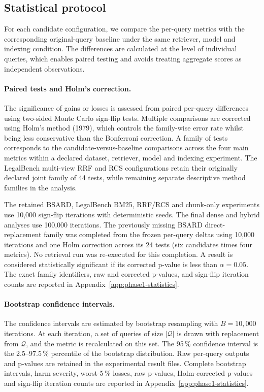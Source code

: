 \documentclass[a4paper,fleqn]{cas-dc}
\begin{document}
\subsection{Statistical protocol}

For each candidate configuration, we compare
the per-query metrics with the corresponding original-query
baseline under the same retriever, model and indexing condition.
The differences are calculated at the level of individual
queries, which enables paired testing and avoids treating
aggregate scores as independent observations.

\paragraph{Paired tests and Holm’s correction.}
The significance of gains or losses is assessed from paired
per-query differences using two-sided Monte Carlo sign-flip tests.
Multiple comparisons are corrected using Holm’s method (1979),
which controls the family-wise error rate whilst being less
conservative than the Bonferroni correction. A family of tests
corresponds to the candidate-versus-baseline comparisons across
the four main metrics within a declared dataset, retriever,
model and indexing experiment. The LegalBench multi-view RRF
and RCS configurations retain their originally declared joint
family of 44 tests, while remaining separate descriptive method
families in the analysis.

The retained BSARD, LegalBench BM25, RRF/RCS and chunk-only
experiments use 10,000 sign-flip iterations with deterministic
seeds. The final dense and hybrid analyses use 100,000
iterations. The previously missing BSARD direct-replacement
family was completed from the frozen per-query deltas using
10,000 iterations and one Holm correction across its 24 tests
(six candidates times four metrics). No retrieval run was
re-executed for this completion. A result is considered
statistically significant if its corrected p-value is less than
$\alpha = 0.05$. The exact family identifiers, raw and corrected
p-values, and sign-flip iteration counts are reported in
Appendix~\ref{app:phase1-statistics}.

\paragraph{Bootstrap confidence intervals.}
The confidence intervals are estimated by
bootstrap resampling with $B = 10,000$
iterations. At each iteration, a set of queries
of size $|\mathcal{Q}|$ is drawn with replacement from
$\mathcal{Q}$, and the metric is recalculated on this
set. The 95\,\% confidence interval is the
2.5–97.5\,\% percentile of the bootstrap distribution.
Raw per-query outputs and p-values are retained in the
experimental result files. Complete bootstrap intervals, harm
severity, worst-5\,\% losses, raw p-values, Holm-corrected
p-values and sign-flip iteration counts are reported in
Appendix~\ref{app:phase1-statistics}.
\end{document}
